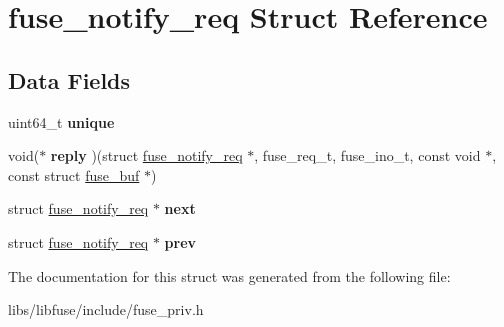 \hypertarget{structfuse__notify__req}{}\section{fuse\+\_\+notify\+\_\+req Struct Reference}
\label{structfuse__notify__req}
\subsection*{Data Fields}
\begin{DoxyCompactItemize}
\item 
uint64\+\_\+t {\bfseries unique}\hypertarget{structfuse__notify__req_a165e51229dec6de7184d3f8116156412}{}\label{structfuse__notify__req_a165e51229dec6de7184d3f8116156412}

\item 
void($\ast$ {\bfseries reply} )(struct \hyperlink{structfuse__notify__req}{fuse\+\_\+notify\+\_\+req} $\ast$, fuse\+\_\+req\+\_\+t, fuse\+\_\+ino\+\_\+t, const void $\ast$, const struct \hyperlink{structfuse__buf}{fuse\+\_\+buf} $\ast$)\hypertarget{structfuse__notify__req_a1e9fc79169cb6aa3f498b20d8e04f195}{}\label{structfuse__notify__req_a1e9fc79169cb6aa3f498b20d8e04f195}

\item 
struct \hyperlink{structfuse__notify__req}{fuse\+\_\+notify\+\_\+req} $\ast$ {\bfseries next}\hypertarget{structfuse__notify__req_aec8a81cbeb9cf90d096edf05c8d14453}{}\label{structfuse__notify__req_aec8a81cbeb9cf90d096edf05c8d14453}

\item 
struct \hyperlink{structfuse__notify__req}{fuse\+\_\+notify\+\_\+req} $\ast$ {\bfseries prev}\hypertarget{structfuse__notify__req_a655520634fb47061a6792390b9b0227d}{}\label{structfuse__notify__req_a655520634fb47061a6792390b9b0227d}

\end{DoxyCompactItemize}


The documentation for this struct was generated from the following file\+:\begin{DoxyCompactItemize}
\item 
libs/libfuse/include/fuse\+\_\+priv.\+h\end{DoxyCompactItemize}
